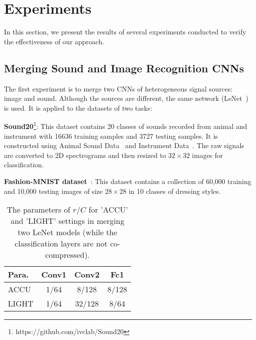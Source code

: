 \documentclass{article}
\begin{document}
	\section{Experiments}
	
	In this section, we present the results of several experiments conducted to verify the effectiveness of our approach.
	
	\subsection*{Merging Sound and Image Recognition CNNs}
	
	The first experiment is to merge two CNNs of heterogeneous signal sources: image and sound.
	Although the sources are different, the same network (LeNet~\cite{LeCun98}) is used.
	It is applied to the datasets of two tasks:
	
	\noindent \textbf{Sound20}\footnote{https://github.com/ivclab/Sound20}: This dataset contains 20 classes of sounds recorded from animal and instrument with 16636 training samples and 3727 testing samples. It is constructed using Animal Sound Data~\cite{keoghmonitoring} and Instrument Data~\cite{Juliani16}.
	The raw signals are converted to 2D spectrograms and then resized to $32\times32$ images for classification. %
	
	
	\noindent \textbf{Fashion-MNIST dataset}~\cite{xiao2017/online}: This dataset contains a collection of 60,000 training and 10,000 testing images of size $28\times28$ in 10 classes of dressing styles.
	
	\begin{table}[t]
		\centering
		\small
		\caption{The parameters of $r/C$ for 'ACCU' and 'LIGHT' settings in merging two LeNet models (while the classification layers are not co-compressed).}
		\label{Experimentone_param}
		\begin{tabular}{lccc}
			\toprule
			Para.       & Conv1       & Conv2      & Fc1           \\ \hline
			ACCU        & 1/64        & 8/128      & 8/128       \\
			LIGHT       & 1/64        & 32/128     & 8/64      \\
			\bottomrule
		\end{tabular}
	\end{table}
	
\end{document}
